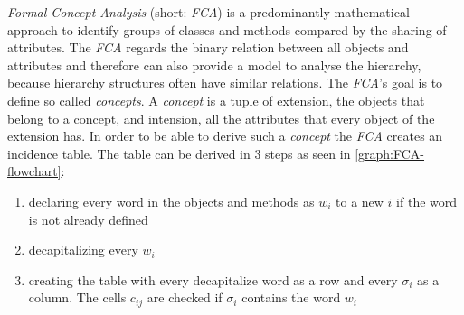\emph{Formal Concept Analysis} (short: \emph{FCA}) is a predominantly mathematical approach to identify groups of classes and methods compared by the sharing of attributes. The \emph{FCA} regards the binary relation between all objects and attributes and therefore can also provide a model to analyse the hierarchy, because hierarchy structures often have similar relations. \newline
The \emph{FCA}'s goal is to define so called \emph{concepts}. A \emph{concept} is a tuple of extension, the objects that belong to a concept, and intension, all the attributes that \underline{every} object of the extension has.
In order to be able to derive such a \emph{concept} the \emph{FCA} creates an incidence table. The table can be derived in 3 steps as seen in \autoref{graph:FCA-flowchart}:
\begin{enumerate}
  \item declaring every word in the objects and methods as $w_i$ to a new $i$ if the word is not already defined
  \item decapitalizing every $w_i$
  \item creating the table with every decapitalize word as a row and every $\sigma_i$ as a column. The cells $c_{ij}$ are checked if  $\sigma_i$ contains the word $w_i$
\end{enumerate}
\pagebreak
